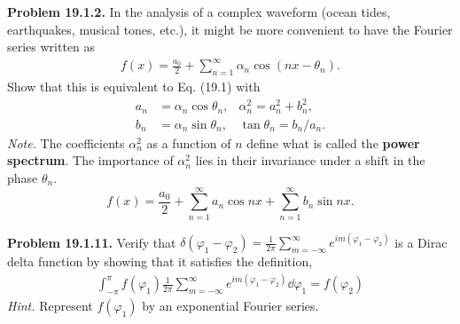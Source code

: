 \documentclass{article}
\begin{document}
\textbf{Problem 19.1.2.} In the analysis of a complex waveform (ocean tides, earthquakes, musical tones, etc.), it might be more convenient to have the Fourier series written as
\begin{equation*}
\begin{aligned}
    f(x)= \frac{a_0}{2} + \sum_{n=1}^\infty \alpha_n\cos(nx-\theta_n).
\end{aligned}
\end{equation*}
Show that this is equivalent to Eq. (19.1) with
\begin{equation*}
\begin{aligned}
    a_n &= \alpha_n\cos\theta_n,&\alpha_n^2 = a_n^2 + b_n^2, \\
    b_n &= \alpha_n\sin\theta_n,&\tan\theta_n = b_n/a_n.
\end{aligned}
\end{equation*}
\textit{Note.} The coefficients $\alpha_n^2$ as a function of $n$ define what is called the \textbf{power spectrum}.
The importance of $\alpha_n^2$ lies in their invariance under a shift in the phase $\theta_n$.
\begin{equation}
    f(x) = \frac{a_0}{2} + \sum_{n=1}^\infty a_n\cos nx + \sum_{n=1}^\infty b_n \sin nx. \tag{19.1}\label{eq:19.1}
\end{equation}

\hrulefill

\textbf{Problem 19.1.11.} Verify that $\delta(\varphi_1-\varphi_2) = \frac{1}{2\pi}\sum_{m=-\infty}^\infty e^{im(\varphi_1-\varphi_2)}$ is a Dirac delta function by showing that it satisfies the definition,
\begin{equation*}
\begin{aligned}
    \int_{-\pi}^\pi f(\varphi_1)\frac{1}{2\pi}\sum_{m=-\infty}^\infty e^{im(\varphi_1-\varphi_2)}\dd\varphi_1 = f(\varphi_2)
\end{aligned}
\end{equation*}
\textit{Hint.} Represent $f(\varphi_1)$ by an exponential Fourier series.

\hrulefill
\end{document}
